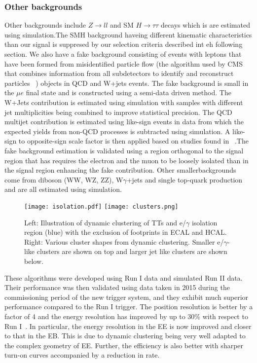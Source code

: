 \documentclass[a4paper,11pt]{article}
\begin{document}
\subsubsection{Other backgrounds}
Other backgrounds include $Z\rightarrow ll$  and SM $H\rightarrow \tau\tau$ decays which is are estimated using simulation.The SMH background haveing different kinematic characteristics than our signal is suppresed by our selection criteria described int eh following section. We also have a fake background consisting of events with leptons that have been formed from misidentified particle flow (the algorithm used by CMS that combines information from all subdetectors to identify and reconstruct particles ~\cite{i}) objects in QCD and W+jets events. The fake background is small in the $\mu e$ final state and is constructed using a semi-data driven method. The W+Jets contribution is estimated using simulation with samples with different jet multiplicities being combined to improve statistical precision. The QCD multijet contribution is estimated using like-sign events in data from which the expected yields from non-QCD processes is subtracted using simulation. A like-sign to opposite-sign scale factor is then applied based on studies found in ~\cite{j}.The fake background estimation is validated using a region orthogonal to the signal region that has requires the electron and the muon to be loosely isolated than in the signal region enhancing the fake contribution. Other smallerbackgrounds come from diboson (WW, WZ, ZZ), W$\gamma$+jets and single top-quark production and are all estimated using simulation.  


\begin{figure}[htbp]
\centering %
\texttt{[image: isolation.pdf]}
\qquad
\texttt{[image: clusters.png]}
\caption{\label{fig:k} Left: Illustration of dynamic clustering of TTs and e/$\gamma$ isolation region (blue) with the exclusion of footprints in ECAL and HCAL. Right: Various cluster shapes from dynamic clustering. Smaller e/$\gamma$-like clusters are shown on top and larger jet like clusters are shown below.}
\end{figure}


These algorithms were developed using Run I data and simulated Run II data. Their performance was then validated using data taken in 2015 during the commissioning period of the new trigger system, and they exhibit much superior performance compared to the Run I trigger. The position resolution is better by  a factor of 4 and the energy resolution has improved by up to 30\% with respect to Run I~\cite{h}. In particular, the energy resolution in the EE is now improved and closer to that in the EB. This is due to dynamic clustering being very well adapted to the complex geometry of EE. Further, the efficiency is also better with sharper turn-on curves accompanied by a reduction in rate.
\end{document}
